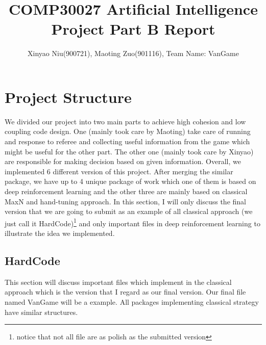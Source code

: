 \documentclass[11pt]{article}
\title{COMP30027 Artificial Intelligence Project Part B Report}
\author{Xinyao Niu(900721), Maoting Zuo(901116), Team Name: VanGame}
\begin{document}
\maketitle


\section{Project Structure}

We divided our project into two main parts to achieve high cohesion and low coupling code design.
One (mainly took care by Maoting) take care of running and response to referee and collecting 
useful information from the game which might be useful for the other part.
The other one (mainly took care by Xinyao) are responsible for making decision based on given information.
Overall, we implemented 6 different version of this project. After merging the similar package, we have 
up to 4 unique package of work which one of them is based on deep reinforcement learning and the other three are
mainly based on classical MaxN and hand-tuning approach. 
In this section, I will only discuss the final version that we are going to submit as an example of all classical
approach (we just call it HardCode)\footnote{notice that not all file are as polish as the submitted version}
and only important files in deep reinforcement learning to illustrate the idea we implemented.

\subsection{HardCode}

This section will discuss important files which implement in the classical approach which is 
the version that I regard as our final version.
Our final file named VanGame will be a example.
All packages implementing classical strategy have similar structures.
\end{document}
